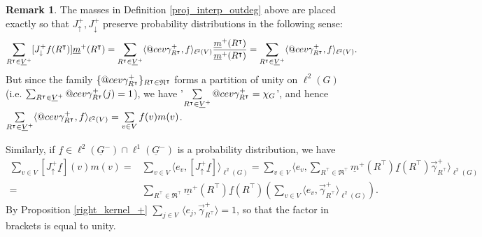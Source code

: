 \documentclass[reqno,12pt,letterpaper]{amsart}
\makeatletter
\numberwithin{equation}{section}
\DeclareRobustCommand{\cev}[1]{%
	\mathpalette\do@cev{#1}%
}
\newcommand{\do@cev}[2]{%
	\fix@cev{#1}{+}%
	\reflectbox{$\m@th#1\vec{\reflectbox{$\fix@cev{#1}{-}\m@th#1#2\fix@cev{#1}{+}$}}$}%
	\fix@cev{#1}{-}%
}
\newcommand{\fix@cev}[2]{%
	\ifx#1\displaystyle
	\mkern#23mu
	\else
	\ifx#1\textstyle
	\mkern#23mu
	\else
	\ifx#1\scriptstyle
	\mkern#22mu
	\else
	\mkern#22mu
	\fi
	\fi
	\fi
}
\newcommand{\1}{\mathds{1}}
\theoremstyle{definition}
\newtheorem{Rem}[Th]{Remark}
\makeatother
\begin{document}
\begin{Rem}	
The masses in
Definition \ref{proj_interp_outdeg} above
  are placed exactly so that  $J_\uparrow^+, J_\downarrow^+$ preserve probability distributions in the following sense:
	\begin{align}
		\sum\limits_{R^\intercal \in \underline{V}^+} [J^+_\downarrow f(R^\intercal)] \underline{m}^+(R^\intercal) 
		=
				\sum\limits_{R^\intercal \in \underline{V}^+}	\langle \cev\gamma^{+}_{R^\intercal} , f \rangle_{\ell^2(V)} \frac{\underline{m}^+(R^\intercal)}{ \underline{m}^+(R^\intercal) } 
		=
			\sum\limits_{R^\intercal \in \underline{V}^+}	\langle \cev\gamma^{+}_{R^\intercal} , f \rangle_{\ell^2(V)}.
		\end{align}
But since the family $\{\cev\gamma^{+}_{R^\intercal}\}_{R^\intercal \in \mathfrak{R}^\intercal}$ forms a partition of unity on $\ell^2(G)$ (i.e. $\sum_{R^\intercal \in \underline{V}^+} \cev\gamma^{+}_{R^\intercal}(j) = 1 $), we have '$\sum\limits_{R^\intercal \in \underline{V}^+}	 \cev\gamma^{+}_{R^\intercal} = \chi_G$', and hence $\sum\limits_{R^\intercal \in \underline{V}^+}	\langle \cev\gamma^{+}_{R^\intercal} , f \rangle_{\ell^2(V)} 
= \sum\limits_{v\in V} f(v) m(v)$.

Similarly, if $\underline{f} \in \ell^2(\underline{G}^-) \cap \ell^1(\underline{G}^-)$ is a probability distribution, we have
\begin{align}
	\sum_{v \in V} [J^+_\uparrow \underline{f}](v) m(v) =&  	\sum_{v \in V} \langle e_v , [J^+_\uparrow \underline{f}]\rangle_{\ell^2(G)}
	=  	\sum_{v \in V}
	 \langle e_v ,	
	\sum_{R^\intercal \in \mathfrak{R}^\intercal} \underline{m}^+(R^\intercal)  \underline{f}(R^\intercal)  \vec\gamma^{+}_{R^\intercal}
	\rangle_{\ell^2(G)}\\
	=& \sum_{R^\intercal \in \mathfrak{R}^\intercal} \underline{m}^+(R^\intercal)      \underline{f}(R^\intercal)         \left( \sum_{v \in V} \langle e_v ,	 \vec\gamma^{+}_{R^\intercal}
	\rangle_{\ell^2(G)} \right).
\end{align}
By Proposition 
\ref{right_kernel_+}  $\sum_{j \in V}\, \langle e_j, \vec\gamma^{+}_{R^\intercal}\rangle =1$, so that the factor in brackets is equal to unity. 
\end{Rem}
	
\end{document}
